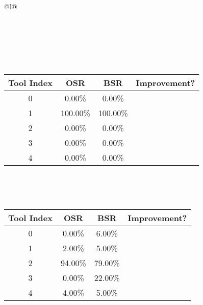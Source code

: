 \begin{longtable}{@{}l@{}}
\caption{Tool selection results for phi4-mini on ollama. \\ \textbf{Overall Improvement: 46.00\%}} \\
\toprule
{} \\
\midrule
\endfirsthead
\toprule
{} \\
\midrule
\endhead
\bottomrule
\endfoot
\begin{minipage}{\textwidth}
\centering{}\\[0.8ex]
\begin{tabular}{|c|c|c|c|} \hline
\textbf{Tool Index} & \textbf{OSR} & \textbf{ BSR} & \textbf{Improvement?} \\ \hline
0 & 0.00\% & 0.00\% & \textcolor{red}{\ding{55}} \\ \hline
1 & 100.00\% & 100.00\% & \textcolor{red}{\ding{55}} \\ \hline
2 & 0.00\% & 0.00\% & \textcolor{red}{\ding{55}} \\ \hline
3 & 0.00\% & 0.00\% & \textcolor{red}{\ding{55}} \\ \hline
4 & 0.00\% & 0.00\% & \textcolor{red}{\ding{55}} \\ \hline
\end{tabular}
\end{minipage}\\[2ex]
\begin{minipage}{\textwidth}
\centering\vspace{2ex}
\\[0.8ex]
\begin{tabular}{|c|c|c|c|} \hline
\textbf{Tool Index} & \textbf{OSR} & \textbf{ BSR} & \textbf{Improvement?} \\ \hline
0 & 0.00\% & 6.00\% & \textcolor{green}{\ding{51}} \\ \hline
1 & 2.00\% & 5.00\% & \textcolor{green}{\ding{51}} \\ \hline
2 & 94.00\% & 79.00\% & \textcolor{red}{\ding{55}} \\ \hline
3 & 0.00\% & 22.00\% & \textcolor{green}{\ding{51}} \\ \hline
4 & 4.00\% & 5.00\% & \textcolor{green}{\ding{51}} \\ \hline
\end{tabular}

\end{minipage}
\end{longtable}

